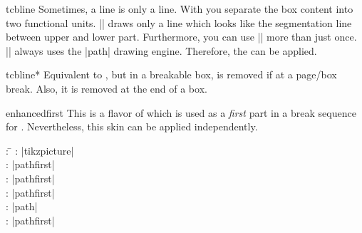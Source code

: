 \clearpage
\begin{docCommand}{tcbline}{}
  Sometimes, a line is only a line. With  you separate
  the box content into two functional units. |\tcbline| draws only a line
  which looks like the segmentation line between upper and lower part.
  Furthermore, you can use |\tcbline| more than just once.
  |\tcbline| always uses the |path| drawing engine. Therefore,
  the  can be applied.

\begin{dispExample}

\begin{tcolorbox}[colupper=red!50!black,collower=green!50!black]
\lipsum[1]
\tcbline
\lipsum[2]
\tcblower
\lipsum[3]
\tcbline
\lipsum[4]
\end{tcolorbox}
\end{dispExample}
\end{docCommand}

\begin{docCommand}{tcbline*}{}
  Equivalent to , but in a breakable box, 
  is removed if at a page/box break. Also, it is removed at the end
  of a box.
\end{docCommand}

\clearpage
\begin{docSkin}{enhancedfirst}
This is a flavor of  which is used as a \emph{first} part
in a break sequence for .
Nevertheless, this skin can be applied independently.
\begin{tcolorbox}[skintable=enhancedfirst]
  \begin{tabbing}
    : \=\kill
    :  \> |tikzpicture|\\ 
    :           \> |pathfirst|\\
    : \> |pathfirst|\\ 
    :        \> |pathfirst|\\
    :    \> |path|\\
    :           \> |pathfirst|
  \end{tabbing}
\end{tcolorbox}
\end{docSkin}


